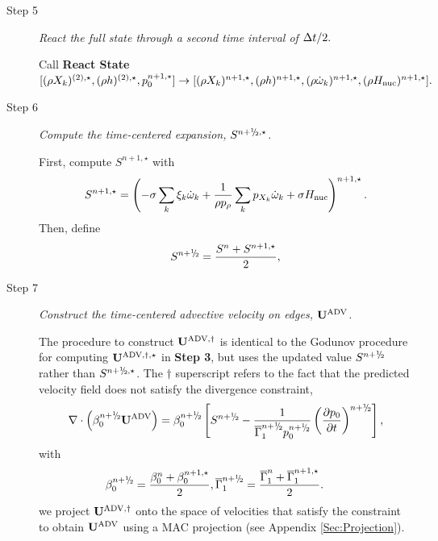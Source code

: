 \begin{description}
\item[Step 5] {\em React the full state through a second time interval of $\Delta t / 2.$}

Call {\bf React State}$[ (\rho X_k)^{(2),\star}, (\rho h)^{(2),\star}, p_0^{n+1,\star}] 
\rightarrow 
[ (\rho X_k)^{n+1,\star}, (\rho h)^{n+1,\star}, (\rho \dot\omega_k)^{n+1,\star}, (\rho H_{\rm nuc})^{n+1,\star} ].$

\item[Step 6] {\em Compute the time-centered expansion, $S^{\nph,\star}$.}

First, compute $S^{n+1,\star}$ with
\begin{equation}
S^{n+1,\star} =  \left(-\sigma  \sum_k  \xi_k  \omegadot_k  + \frac{1}{\rho p_\rho} \sum_k p_{X_k}  {\omegadot}_k + \sigma \Hnuc\right)^{n+1,\star}.
\end{equation}
  Then, define
\begin{equation}
 S^{\nph} = \frac{S^n + S^{n+1,\star}}{2},
\end{equation}

\item[Step 7] {\em Construct the time-centered advective velocity on edges, ${\bf{U}}^{\mathrm{ADV}}$.}

The procedure to construct ${\bf{U}}^{\mathrm{ADV},\dagger}$ is identical to the Godunov procedure
for computing ${\bf{U}}^{\mathrm{ADV},\dagger,\star}$ in {\bf Step 3}, but uses
the updated value $S^{\nph}$ rather than $S^{\nph,\star}$.
The $\dagger$ superscript refers to the fact that the predicted velocity field does not satisfy the divergence constraint,
\begin{equation}
\nabla \cdot \left(\beta_0^{\nph} \uadvtwo\right) =
\beta_0^{\nph} \left[S^{\nph} - \frac{1}{\gammaonebar^{\nph}p_0^{\nph}}\left(\frac{\partial p_0}{\partial t}\right)^{\nph}\right],\label{eq:div2}
\end{equation}
with
\begin{equation}
\beta_0^{\nph} = \frac{ \beta_0^n +  \beta_0^{n+1,\star} }{2},
\gammaonebar^{\nph} = \frac{ \gammaonebar^n +  \gammaonebar^{n+1,\star} }{2}.
\qquad
\end{equation}
we project ${\bf{U}}^{\mathrm{ADV},\dagger}$ onto the space of velocities that satisfy the constraint to obtain ${\bf{U}}^{\mathrm{ADV}}$ using a MAC projection (see Appendix \ref{Sec:Projection}).


\end{description}
